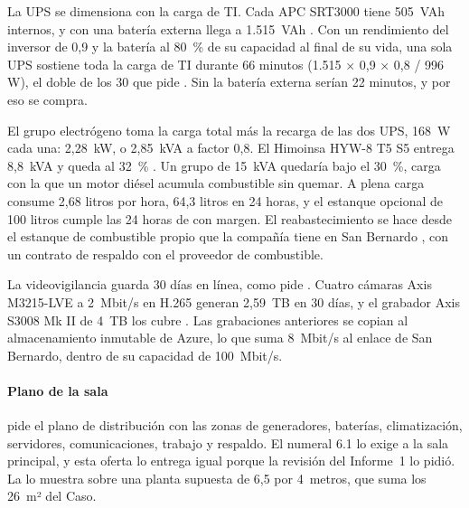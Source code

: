 La UPS se dimensiona con la carga de TI. Cada APC SRT3000 tiene 505~VAh internos, y con una batería
externa llega a 1.515~VAh \parencite{apc_srt3000}. Con un rendimiento del inversor de 0,9 y la batería al
80~\% de su capacidad al final de su vida, una sola UPS sostiene toda la carga de TI durante 66 minutos
(1.515 × 0,9 × 0,8 / 996 W), el doble de los 30 que pide . Sin la batería externa
serían 22 minutos, y por eso se compra.

El grupo electrógeno toma la carga total más la recarga de las dos UPS, 168~W cada una: 2,28~kW, o
2,85~kVA a factor 0,8. El Himoinsa HYW-8 T5 S5 entrega 8,8~kVA y queda al 32~\% \parencite{himoinsa_hyw8}.
Un grupo de 15~kVA quedaría bajo el 30~\%, carga con la que un motor diésel acumula combustible sin
quemar. A plena carga consume 2,68 litros por hora, 64,3 litros en 24 horas, y el estanque opcional de
100 litros cumple las 24 horas de  con margen. El reabastecimiento se hace desde el
estanque de combustible propio que la compañía tiene en San Bernardo , con un
contrato de respaldo con el proveedor de combustible.

La videovigilancia guarda 30 días en línea, como pide . Cuatro cámaras Axis
M3215-LVE a 2~Mbit/s en H.265 generan 2,59~TB en 30 días, y el grabador Axis S3008 Mk II de 4~TB los
cubre \parencite{axis_m3215,axis_s3008}. Las grabaciones anteriores se copian al almacenamiento inmutable
de Azure, lo que suma 8~Mbit/s al enlace de San Bernardo, dentro de su capacidad de 100~Mbit/s.

\paragraph{Plano de la sala}  pide el plano de distribución con las zonas de
generadores, baterías, climatización, servidores, comunicaciones, trabajo y respaldo. El numeral 6.1 lo
exige a la sala principal, y esta oferta lo entrega igual porque la revisión del Informe~1 lo pidió. La
 lo muestra sobre una planta supuesta de 6,5 por 4~metros, que suma los 26~m²
del Caso.


